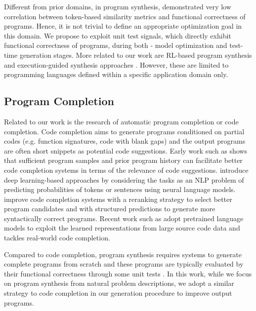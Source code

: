 \documentclass{article}
\begin{document}
Different from prior domains, in program synthesis, \citet{austin2021program, chen2021evaluating, li2022competition} demonstrated very low correlation between token-based similarity metrics and functional correctness of programs.
Hence, it is not trivial to define an appropriate optimization goal in this domain.
We propose to exploit unit test signals, which directly exhibit functional correctness of programs, during both - model optimization and test-time generation stages. 
More related to our work are RL-based program synthesis \citep{guu-etal-2017-language, bunel2018leveraging, liang2018memory, zhong2018seqsql} and execution-guided synthesis approaches \citep{ellis2019write, chen2021latent}.
However, these are limited to programming languages defined within a specific application domain only.











\subsection{Program Completion}

Related to our work is the research of automatic program completion or code completion.
Code completion aims to generate programs conditioned on partial codes (e.g. function signatures, code with blank gaps) and the output programs are often short snippets as potential code suggestions. 
Early work such as \citep{robbes2008program, bruch2009learning} shows that sufficient program samples and prior program history can facilitate better code completion systems in terms of the relevance of code suggestions. 
\citet{raychev2014code, white2015toward} introduce deep learning-based approaches by considering the tasks as an NLP problem of predicting probabilities of tokens or sentences using neural language models. 
\citet{svyatkovskiy2021fast, guo2021learning} improve code completion systems with a reranking strategy to select better program candidates and with structured predictions to generate more syntactically correct programs.  
Recent work such as \citep{clement-etal-2020-pymt5, svyatkovskiy2020intellicode} adopt pretrained language models to exploit the learned representations from large source code data and \citep{aye2021learning} tackles real-world code completion. 

Compared to code completion, program synthesis requires systems to generate complete programs from scratch and these programs are typically evaluated by their functional correctness through some unit tests \citep{hendrycksapps2021, li2022competition}. 
In this work, while we focus on program synthesis from natural problem descriptions, we adopt a similar strategy to code completion in our generation procedure to improve output programs. 
\end{document}

